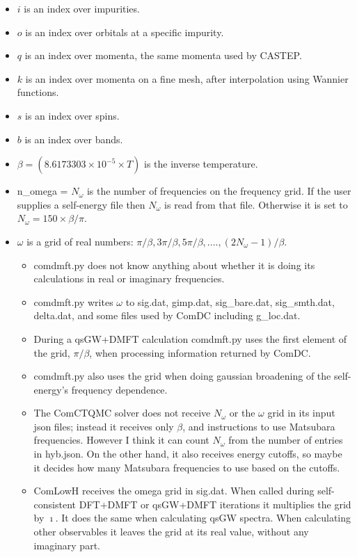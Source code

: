 \documentclass[aps,prb,singlecolumn,preprintnumbers,amsmath,amssymb]{revtex4}
\begin{document}
\begin{itemize}
\item $i$ is an index over impurities.
\item $o$ is an index over orbitals at a specific impurity.
\item $q$ is an index over momenta, the same momenta used by CASTEP.
\item $k$ is an index over  momenta on a fine mesh, after interpolation using Wannier functions.
\item $s$ is an index over spins.  
\item $b$ is an index over bands.
\item $\beta = (8.6173303 \times 10^{-5} \times T) $ is the inverse temperature.  
\item n\_omega = $N_\omega$ is the number of frequencies on the frequency grid.  If the user supplies a self-energy file then $N_\omega$ is read from that file.  Otherwise it is set to $N_\omega = 150 \times \beta / \pi$.
\item $\omega$ is a grid of real numbers: $\pi/\beta, 3\pi/\beta, 5\pi/\beta, .... , (2 N_\omega - 1)/\beta $.  
\begin{itemize}
\item comdmft.py does not know anything about whether it is doing its calculations in real or imaginary frequencies.  
\item comdmft.py writes $\omega$ to sig.dat, gimp.dat, sig\_bare.dat, sig\_smth.dat,  delta.dat,  and some files used by ComDC including g\_loc.dat. 
\item During a qsGW+DMFT calculation comdmft.py uses the first element of the grid, $\pi/\beta$, when processing information returned by ComDC.
\item   comdmft.py also uses the grid when doing gaussian broadening of the self-energy's frequency dependence.
\item The ComCTQMC solver does not receive $N_\omega$ or the $\omega$ grid in its input json files; instead it receives only $\beta$, and instructions to use Matsubara frequencies.  However I think it can count $N_\omega$ from the number of entries in hyb.json.  On the other hand, it also receives energy cutoffs, so maybe it decides how many Matsubara frequencies to use based on the cutoffs.
\item ComLowH receives the omega grid in sig.dat.  When called during self-consistent DFT+DMFT or qsGW+DMFT iterations it multiplies the grid by $\imath$.  It does the same when calculating qsGW spectra.  When calculating other observables it leaves the grid at its real value,  without any imaginary part.
\end{itemize}


\end{itemize}
\end{document}
